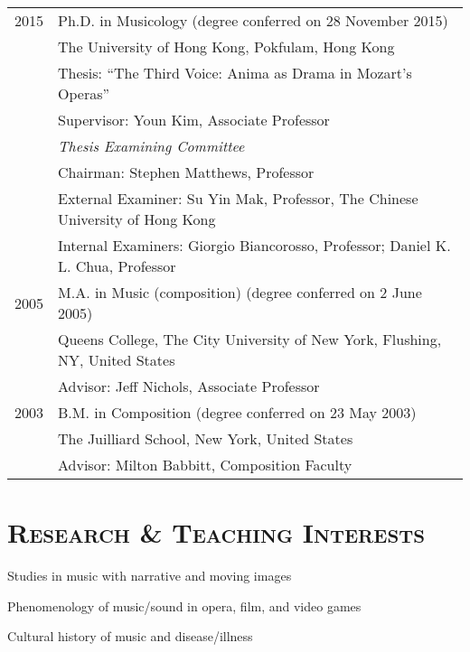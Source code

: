 \documentclass[a4paper,11pt,draft]{article}
\begin{document}
  \hspace*{-0.25cm}
  \begin{tabular}{p{2.5cm} l}
    2015 & Ph.D. in Musicology (degree conferred on 28 November 2015)\\
    & The University of Hong Kong, Pokfulam, Hong Kong\\
    & Thesis: ``The Third Voice: Anima as Drama in Mozart's Operas''\\
    & Supervisor: Youn Kim, Associate Professor\\[2mm]
    & \textit{Thesis Examining Committee}\\
    & Chairman: Stephen Matthews, Professor\\
    & External Examiner: Su Yin Mak, Professor, The Chinese University of Hong Kong\\
    & Internal Examiners: Giorgio Biancorosso, Professor; Daniel K. L. Chua, Professor\\[2mm]
    
	2005 & M.A. in Music (composition) (degree conferred on 2 June 2005)\\
    & Queens College, The City University of New York, Flushing, NY, United
    States\\
	& Advisor: Jeff Nichols, Associate Professor\\[2mm]

    2003 & B.M. in Composition (degree conferred on 23 May 2003)\\
    & The Juilliard School, New York, United States\\
    & Advisor: Milton Babbitt, Composition Faculty
  \end{tabular}
  
  \vspace{5mm}
  
  \section*{\textsc{Research \& Teaching Interests}}
  
  \hspace{2mm} \textbullet \hspace{2mm} Studies in music with narrative and moving images
  
  \noindent \hspace{2mm} \textbullet \hspace{2mm} Phenomenology of music/sound in opera, film, and video games
  
  \noindent \hspace{2mm} \textbullet \hspace{2mm} Cultural history of music and
  disease/illness
  
\end{document}
